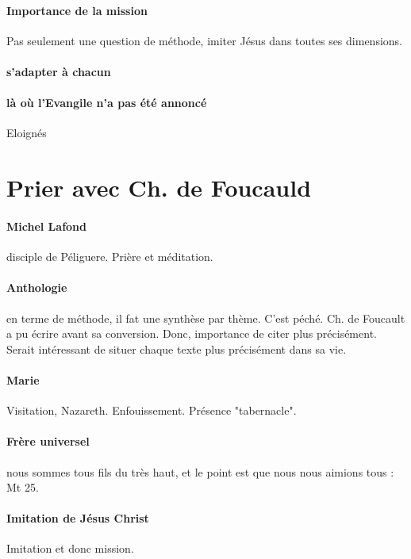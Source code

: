 \paragraph{Importance de la mission} Pas seulement une question de méthode, imiter Jésus dans toutes ses dimensions. 

\paragraph{s'adapter à chacun}
\paragraph{là où l'Evangile n'a pas été annoncé} 
Eloignés

\section{Prier avec Ch. de Foucauld}

\paragraph{Michel Lafond} disciple de Péliguere. Prière et méditation. 

\paragraph{Anthologie} en terme de méthode, il fat une synthèse par thème. C'est péché. Ch. de Foucault a pu écrire avant sa conversion. Donc, importance de citer plus précisément. Serait intéressant de situer chaque texte plus précisément dans sa vie.

\paragraph{Marie} Visitation, Nazareth. Enfouissement. Présence "tabernacle".

\paragraph{Frère universel} nous sommes tous fils du très haut, et le point est que nous nous aimions tous : Mt 25. 

\paragraph{Imitation de Jésus Christ} Imitation et donc mission. 


